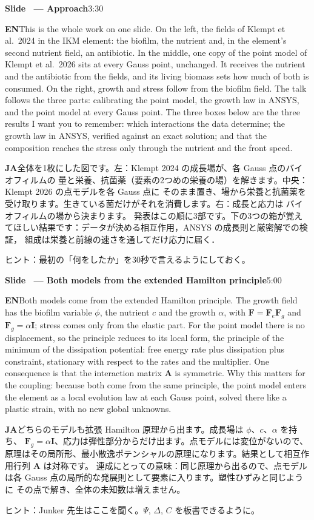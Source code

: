 \documentclass[11pt,a4paper]{article}
\newcounter{sl}
\newcommand{\slide}[2]{\stepcounter{sl}\vspace{8pt}%
  {\color{c3}\large\bfseries Slide \thesl\ --- #1}\hfill{\small #2}\par\vspace{2pt}}
\newcommand{\EN}{\textbf{EN}\quad}
\newcommand{\JA}{\par\textbf{JA}\quad}
\newcommand{\hint}[1]{\par{\color{gray}\small ヒント：#1}}
\begin{document}
\slide{Approach}{3:30}
\EN This is the whole work on one slide. On the left, the fields of Klempt
et al.\ 2024 in the IKM element: the biofilm, the nutrient and, in the
element's second nutrient field, an antibiotic. In the middle, one copy of the
point model of Klempt et al.\ 2026 sits at every Gauss point, unchanged. It
receives the nutrient and the antibiotic from the fields, and its living
biomass sets how much of both is consumed. On the right, growth and stress
follow from the biofilm field. The talk follows the three parts: calibrating
the point model, the growth law in ANSYS, and the point model at every Gauss
point. The three boxes below are the three results I want you to remember: which interactions the data
determine; the growth law in ANSYS, verified against an exact solution; and that the composition reaches the stress
only through the nutrient and the front speed.
\JA 全体を1枚にした図です。左：Klempt 2024 の成長場が、各 Gauss 点のバイオフィルムの
量と栄養、抗菌薬（要素の2つめの栄養の場）を解きます。中央：Klempt 2026 の点モデルを各 Gauss 点に
そのまま置き、場から栄養と抗菌薬を受け取ります。生きている菌だけがそれを消費します。右：成長と応力は
バイオフィルムの場から決まります。
発表はこの順に3部です。下の3つの箱が覚えてほしい結果です：データが決める相互作用，ANSYS の成長則と厳密解での検証，
組成は栄養と前線の速さを通してだけ応力に届く．
\hint{最初の「何をしたか」を30秒で言えるようにしておく。}

\slide{Both models from the extended Hamilton principle}{5:00}
\EN Both models come from the extended Hamilton principle. The growth field
has the biofilm variable $\phi$, the nutrient $c$ and the growth $\alpha$,
with $\mathbf F=\mathbf F_e\mathbf F_g$ and $\mathbf F_g=\alpha\mathbf I$;
stress comes only from the elastic part. For the point model there is no
displacement, so the principle reduces to its local form, the principle of
the minimum of the dissipation potential: free energy rate plus dissipation
plus constraint, stationary with respect to the rates and the multiplier. One
consequence is that the interaction matrix $\mathbf A$ is symmetric.
Why this matters for the coupling: because both come from the same principle, the point model enters the element
as a local evolution law at each Gauss point, solved there like a plastic strain, with no new global unknowns.
\JA どちらのモデルも拡張 Hamilton 原理から出ます。成長場は $\phi$、$c$、$\alpha$ を持ち、
$\mathbf F_g=\alpha\mathbf I$、応力は弾性部分からだけ出ます。点モデルには変位がないので、
原理はその局所形、最小散逸ポテンシャルの原理になります。結果として相互作用行列
$\mathbf A$ は対称です。
連成にとっての意味：同じ原理から出るので、点モデルは各 Gauss 点の局所的な発展則として要素に入ります。塑性ひずみと同じように
その点で解き、全体の未知数は増えません。
\hint{Junker 先生はここを聞く。$\Psi$, $\Delta$, $C$ を板書できるように。}
\end{document}
